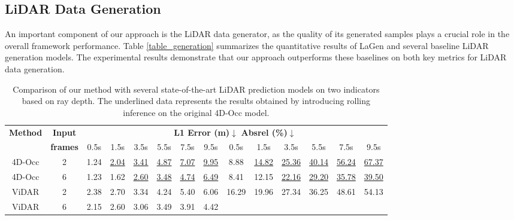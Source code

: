 \subsection{LiDAR Data Generation}
An important component of our approach is the LiDAR data generator, as the quality of its generated samples plays a crucial role in the overall framework performance.
Table \ref{table_generation} summarizes the quantitative results of LaGen and several baseline LiDAR generation models.
The experimental results demonstrate that our approach outperforms these baselines on both key metrics for LiDAR data generation.

\setlength{\tabcolsep}{5.3pt} 
\begin{table}[ht]
\centering
\caption{Comparison of our method with several state-of-the-art LiDAR prediction models on two indicators based on ray depth. The underlined data represents the results obtained by introducing rolling inference on the original 4D-Occ model.}
\renewcommand{\arraystretch}{1.17}
\begin{tabular}{cccccccc|cccccc}
\toprule
 \textbf{Method} & \textbf{Input} &
\multicolumn{12}{c}{\textbf{L1 Error (m)$\downarrow$} \qquad \qquad \qquad \qquad \qquad \qquad \qquad \textbf{Absrel (\%)$\downarrow$} \quad} \\
\cmidrule(l{3pt}r{3pt}){3-14} 
&\textbf{frames}& 0.5s & 1.5s & 3.5s & 5.5s & 7.5s & 9.5s & 0.5s & 1.5s & 3.5s & 5.5s & 7.5s & 9.5s \\
\midrule
4D-Occ \cite{khurana2023point}  
& 2 
& 1.24 & \underline{2.04} & \underline{3.41} & \underline{4.87} & \underline{7.07} &\underline{9.95}  
& 8.88 & \underline{14.82} & \underline{25.36} & \underline{40.14} & \underline{56.24} & \underline{67.37}\\
4D-Occ  \cite{khurana2023point} 
& 6 
& \cellcolor{Lavender} 1.23 & \cellcolor{Lavender} 1.62 & \cellcolor{Lavender} \underline{2.60} & \cellcolor{Lavender} \underline{3.48} & \underline{4.74} & \underline{6.49} 
& \cellcolor{Lavender} 8.41 & \cellcolor{Lavender} 12.15 & \cellcolor{Lavender} \underline{22.16} & \cellcolor{Lavender} \underline{29.20} & \underline{35.78} & \underline{39.50} \\
\midrule
ViDAR \cite{yang2024visual} 
& 2 
& 2.38 & 2.70 & 3.34 & 4.24 & 5.40 & 6.06 
& 16.29 & 19.96 & 27.34 & 36.25 & 48.61 & 54.13 \\
ViDAR \cite{yang2024visual} 
& 6
& 2.15 & 2.60 & 3.06 & 3.49 & \cellcolor{Lavender} 3.91 & \cellcolor{Lavender} 4.42 

\end{tabular}
\end{table}
